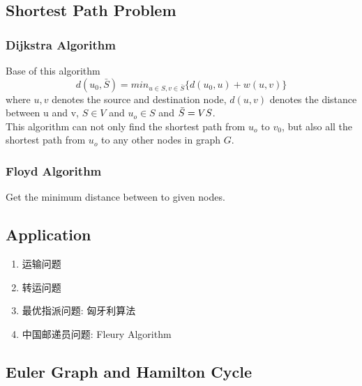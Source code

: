 \documentclass[12pt,a4paper]{article} \usepackage{kurier}
\begin{document}
\begin{CJK}{UTF8}{gkai}
\begin{multicols}{2}
	\subsection{Shortest Path Problem}
		\subsubsection{Dijkstra Algorithm}
			Base of this algorithm
				\[ d(u_0, \bar{S}) = min_{u\in S, v\in \bar{S}} \{ d(u_0, u) + w (u, v) \} \]
			where $u,v$ denotes the source and destination node,
			$d(u,v)$ denotes the distance between u and v, 
			$S \in V$ and $u_o \in S$ and $\bar{S} = V\\S$.\\
			This algorithm can not only find the shortest path from $u_o$ to $v_0$, but also
			all the shortest path from $u_o$ to any other nodes in graph $G$.
		\subsubsection{Floyd Algorithm}
			Get the minimum distance between to given nodes.
	\subsection{Application}
		\begin{enumerate}
		\item 运输问题
		\item 转运问题
		\item 最优指派问题: 匈牙利算法
		\item 中国邮递员问题: Fleury Algorithm
		\end{enumerate}
	\subsection{Euler Graph and Hamilton Cycle}

\end{multicols}
\end{CJK}
\end{document}
